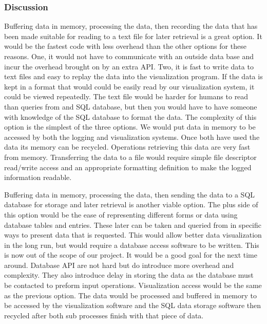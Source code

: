 \documentclass[10pt,draftclsnofoot,onecolumn,retainorgcmds]{IEEEtran}
\begin{document}
\subsubsection{Discussion}
Buffering data in memory, processing the data, then recording the data that has been made suitable for reading to a text file for later retrieval is a great option. It would be the fastest code with less overhead than the other options for these reasons. One, it would not have to communicate with an outside data base and incur the overhead brought on by an extra API.  Two, it is fast to write data to text files and easy to replay the data into the visualization program. If the data is kept in a format that would could be easily read by our visualization system, it could be viewed repeatedly. The text file would be harder for humans to read than queries from and SQL database, but then you would have to have someone with knowledge of the SQL database to format the data. The complexity of this option is the simplest of the three options. We would put data in memory to be accessed by both the logging and visualization systems. Once both have used the data its memory can be recycled. Operations retrieving this data are very fast from memory. Transferring the data to a file would require simple file descriptor read/write access and an appropriate formatting definition to make the logged information readable.\par
Buffering data in memory, processing the data, then sending the data to a SQL database for storage and later retrieval is another viable option. The plus side of this option would be the ease of representing different forms or data using database tables and entries. These later can be taken and queried from in specific ways to present data that is requested. This would allow better data visualization in the long run, but would require a database access software to be written. This is now out of the scope of our project. It would be a good goal for the next time around. Database API are not hard but do introduce more overhead and complexity. They also introduce delay in storing the data as the database must be contacted to preform input operations. Visualization access would be the same as the previous option. The data would be processed and buffered in memory to be accessed by the visualization software and the SQL data storage software then recycled after both sub processes finish with that piece of data.\par
\end{document}
